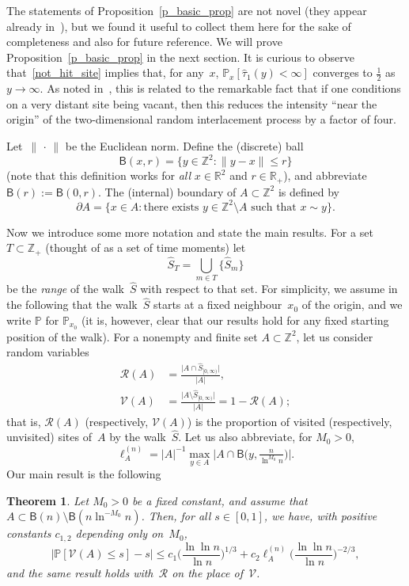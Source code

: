 \documentclass[11pt]{article}
\newtheorem{theo}{Theorem}[section]
\theoremstyle{definition}
\numberwithin{equation}{section}
\numberwithin{figure}{section}
\numberwithin{table}{section}
\newcommand{\1}[1]{{\mathbf 1}{\{#1\}}}
\newcommand{\Z}{\mathbb{Z}}
\newcommand{\V}{{\mathcal V}}
\newcommand{\RR}{{\mathcal R}}
\newcommand{\R}{{\mathbb R}}
\newcommand{\s}{{\widehat S}}
\newcommand{\8}{{\infty}}
\newcommand{\IP}{{\mathbb P}}
\newcommand{\htau}{\widehat{\tau}}
\newcommand{\B}{{\mathsf B}}
\begin{document}
The statements of Proposition~\ref{p_basic_prop} are not novel (they appear already in~\cite{CPV16}), but we found it useful to collect them here for the sake of completeness and also for future reference. We will prove Proposition~\ref{p_basic_prop} in the next section. It is curious to observe that~\eqref{not_hit_site} implies that, for any~$x$, $\IP_x[\htau_1(y)<\infty]$ converges to $\frac{1}{2}$ as $y\to \infty$. As noted in~\cite{CPV16}, this is related to the remarkable fact that if one conditions on a very distant site being vacant, then this reduces the intensity ``near the origin'' of the two-dimensional random interlacement process by a factor of four.

Let~$\|{\,\cdot\,}\|$ be the Euclidean norm. Define the (discrete) ball
\[
\B(x,r) = \{y\in \Z^2: \|y-x\|\leq r\}
\]
(note that this definition works for \emph{all} $x\in\R^2$ and $r\in\R_+$), and abbreviate $\B(r):=\B(0,r)$. The (internal) boundary of $A\subset\Z^2$ is defined by
\[
\partial A = \{x\in A: \text{there exists }y\in \Z^2\setminus A
\text{ such that }x\sim y\}.
\]

Now we introduce some more notation and state the main results. For a set $T\subset\Z_+$ (thought of as a set of time moments) let
\[
\s_T=\bigcup_{m\in T}\big\{\s_m\big\}
\]
be the \emph{range} of the walk~$\s$ with respect to that set. For simplicity, we assume in the following that the walk~$\s$ starts at a fixed neighbour~$x_0$ of the origin, and we write $\IP$ for $\IP_{x_0}$ (it is, however, clear that our results hold for any fixed starting position of the walk). For a nonempty and finite set $A\subset \Z^2$, let us consider random variables
\begin{align*}
\RR(A) &= \frac{\big|A\cap \s_{[0,\infty)}\big|}{|A|},\\
\V(A) &= \frac{\big|A\setminus \s_{[0,\infty)}\big|}{|A|} = 1-\RR(A);
\end{align*}
that is, $\RR(A)$ (respectively, $\V(A)$) is the proportion of visited (respectively, unvisited) sites of~$A$ by the walk~$\s$. Let us also abbreviate, for $M_0 > 0$,
\begin{equation}\label{df_ell_A}
\ell^{(n)}_A= |A|^{-1}
\max_{y\in A}
\big|A\cap \B\big(y,{\tfrac{n}{\ln^{M_0}n}}\big)\big|.
\end{equation}
Our main result is the following
\begin{theo}\label{t_main_res}
Let $M_0>0$ be a fixed constant, and assume that $A\subset \B(n)\setminus \B(n\ln^{-M_0}n)$. Then, for all $s\in [0,1]$, we have, with positive constants $c_{1,2}$ depending only on~$M_0$,
\begin{equation}\label{main_res}
\big|\IP[\V(A)\leq s] - s\big|
\leq c_1\Big(\frac{\ln\ln n}{\ln n}\Big)^{1/3} + c_2\ell^{(n)}_A \Big(\frac{\ln\ln n}{\ln n}\Big)^{-2/3},
\end{equation}
and the same result holds with~$\RR$ on the place of~$\V$.
\end{theo}
\end{document}
